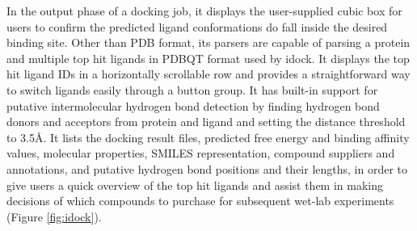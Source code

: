 \documentclass[twocolumn]{bmcart}%
\begin{document}
In the output phase of a docking job, it displays the user-supplied cubic box for users to confirm the predicted ligand conformations do fall inside the desired binding site. Other than PDB format, its parsers are capable of parsing a protein and multiple top hit ligands in PDBQT format used by idock. It displays the top hit ligand IDs in a horizontally scrollable row and provides a straightforward way to switch ligands easily through a button group. It has built-in support for putative intermolecular hydrogen bond detection by finding hydrogen bond donors and acceptors from protein and ligand and setting the distance threshold to 3.5\AA. It lists the docking result files, predicted free energy and binding affinity values, molecular properties, SMILES representation, compound suppliers and annotations, and putative hydrogen bond positions and their lengths, in order to give users a quick overview of the top hit ligands and assist them in making decisions of which compounds to purchase for subsequent wet-lab experiments (Figure \ref{fig:idock}).

\end{document}
